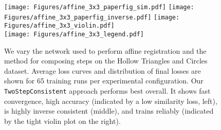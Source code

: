 \begin{figure}[t!]
	\centering
	\texttt{[image: Figures/affine\_3x3\_paperfig\_sim.pdf]}\hfill
	\texttt{[image: Figures/affine\_3x3\_paperfig\_inverse.pdf]}\hfill
	\texttt{[image: Figures/affine\_3x3\_violin.pdf]}\\
	\vspace{-.6em}
	\texttt{[image: Figures/affine\_3x3\_legend.pdf]}
	\vspace{-0.2cm}
	\caption{We vary the network used to perform affine registration and the method for composing steps on the Hollow Triangles and Circles dataset. Average loss curves and distribution of final losses are shown for 65 training runs per experimental configuration. Our \texttt{TwoStepConsistent} approach performs best overall. It shows fast convergence, high accuracy (indicated by a low similarity loss, left), is highly inverse consistent (middle), and trains reliably (indicated by the tight violin plot on the right).%
	}
	\label{fig:affine_3x3}
\end{figure}

